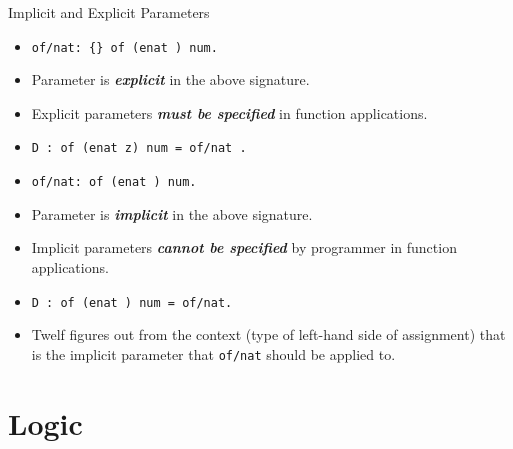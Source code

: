 \documentclass{beamer}
\renewcommand{\emph}[1]{\textbf{\textit{#1}}}
\begin{document}
\begin{frame}{Implicit and Explicit Parameters}
\begin{itemize}
\item \texttt{of/nat: \{\} of (enat ) num.}

\item Parameter \texttt{} is \emph{explicit}
in the above signature.
\item Explicit parameters \emph{must be specified} in
function applications.

\item \texttt{D : of (enat z) num = of/nat .}
\end{itemize}

\pause
\begin{itemize}
\item \texttt{of/nat: of (enat ) num.}
\item Parameter \texttt{} is \emph{implicit}
in the above signature.
\item Implicit parameters \emph{cannot be specified}
by programmer in function applications.
\item \texttt{D : of (enat ) num = of/nat.}
\item Twelf figures out from the context
(type of left-hand side of assignment)
that \texttt{} is the implicit parameter that
\texttt{of/nat} should be applied to.
\end{itemize}
\end{frame}


\section{Logic}
\end{document}
